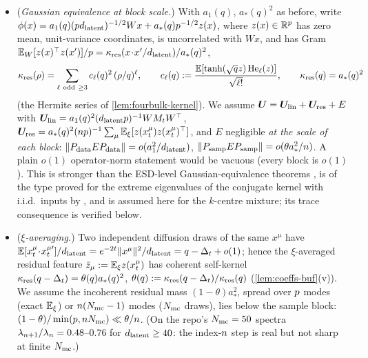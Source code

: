\begin{assumption}\label{assump:inputs-buf}
\begin{itemize}
\item[(H1)] (\emph{Gaussian equivalence at block scale.}) With $a_1(q)$, $a_*(q)^2$ as before, write $\phi(x)=a_1(q)(pd_{\mathrm{latent}})^{-1/2}Wx+a_*(q)p^{-1/2}z(x)$, where $z(x)\in\mathbb{R}^{p}$ has zero mean, unit-variance coordinates, is uncorrelated with $Wx$, and has Gram $\mathbb{E}_W[z(x)^\top z(x')]/p=\kappa_{\rm res}(x\!\cdot\!x'/d_{\mathrm{latent}})/a_*(q)^2$,
\begin{equation}
\kappa_{\rm res}(\rho)=\sum_{\ell\ {\rm odd}\ \ge3}c_\ell(q)^2\,(\rho/q)^\ell,\qquad c_\ell(q):=\frac{\mathbb{E}[\tanh(\sqrt qz)\,\mathrm{He}_\ell(z)]}{\sqrt{\ell!}},\qquad\kappa_{\rm res}(q)=a_*(q)^2
\label{eq:kres-buf}
\end{equation}
(the Hermite series of \cref{lem:fourbulk-kernel}). We assume $\bm{U}=\bm{U}_{\rm lin}+\bm{U}_{\rm res}+E$ with $\bm{U}_{\rm lin}=a_1(q)^2(d_{\mathrm{latent}}p)^{-1}WM_tW^\top$, $\bm{U}_{\rm res}=a_*(q)^2(np)^{-1}\sum_\mu\mathbb{E}_\xi[z(x^\mu_t)z(x^\mu_t)^\top]$, and $E$ negligible \emph{at the scale of each block}: $\|P_{\rm data}EP_{\rm data}\|=o(a_1^2/d_{\mathrm{latent}})$, $\|P_{\rm samp}EP_{\rm samp}\|=o(\theta a_*^2/n)$. A plain $o(1)$ operator-norm statement would be vacuous (every block is $o(1)$). This is stronger than the ESD-level Gaussian-equivalence theorems \citep{goldt2022gaussian,hu2022universality,mei2022generalization}, is of the type proved for the extreme eigenvalues of the conjugate kernel with i.i.d.\ inputs by \citet{benigni2021eigenvalue}, and is assumed here for the $k$-centre mixture; its trace consequence is verified below.
\item[(H2)] (\emph{$\xi$-averaging.}) Two independent diffusion draws of the same $x^\mu$ have $\mathbb{E}[x^\mu_t\!\cdot\!x^{\mu\prime}_t]/d_{\mathrm{latent}}=e^{-2t}\|x^\mu\|^2/d_{\mathrm{latent}}=q-\Delta_t+o(1)$; hence the $\xi$-averaged residual feature $\bar z_\mu:=\mathbb{E}_\xi z(x^\mu_t)$ has coherent self-kernel $\kappa_{\rm res}(q-\Delta_t)=\theta(q)a_*(q)^2$, $\theta(q):=\kappa_{\rm res}(q-\Delta_t)/\kappa_{\rm res}(q)$ (\cref{lem:coeffs-buf}(v)). We assume the incoherent residual mass $(1-\theta)a_*^2$, spread over $p$ modes (exact $\mathbb{E}_\xi$) or $n(N_{\rm mc}-1)$ modes ($N_{\rm mc}$ draws), lies below the sample block: $(1-\theta)/\min(p,n N_{\rm mc})\ll\theta/n$. (On the repo's $N_{\rm mc}=50$ spectra $\lambda_{n+1}/\lambda_{n}=0.48$--$0.76$ for $d_{\mathrm{latent}}\ge40$: the index-$n$ step is real but not sharp at finite $N_{\rm mc}$.)

\end{itemize}
\end{assumption}
